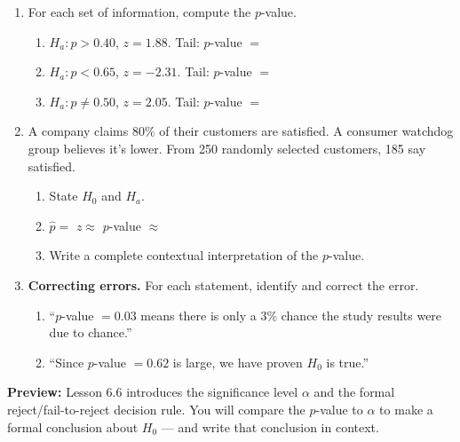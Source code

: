\documentclass[10pt]{article}
\begin{document}
\namedateperiod

\vspace{0.15in}

\begin{enumerate}

  \item For each set of information, compute the $p$-value.
        \begin{enumerate}[label=\alph*.]
          \item $H_a: p > 0.40$, $z = 1.88$. Tail: \blank{2cm} \quad $p$-value $=$ \blank{4cm}
          \item $H_a: p < 0.65$, $z = -2.31$. Tail: \blank{2cm} \quad $p$-value $=$ \blank{4cm}
          \item $H_a: p \ne 0.50$, $z = 2.05$. Tail: \blank{2cm} \quad $p$-value $=$ \blank{4cm}
        \end{enumerate}

  \item A company claims 80\% of their customers are satisfied. A consumer watchdog group
        believes it's lower. From 250 randomly selected customers, 185 say satisfied.
        \begin{enumerate}[label=\alph*.]
          \item State $H_0$ and $H_a$. \blank{8cm}
          \item $\hat p = $ \blank{2cm} \quad $z \approx$ \blank{2cm} \quad $p$-value $\approx$ \blank{3cm}
          \item Write a complete contextual interpretation of the $p$-value. 
        \end{enumerate}

  \item \textbf{Correcting errors.} For each statement, identify and correct the error.
        \begin{enumerate}[label=\alph*.]
          \item ``$p$-value $= 0.03$ means there is only a 3\% chance the study results were
                due to chance.'' 
          \item ``Since $p$-value $= 0.62$ is large, we have proven $H_0$ is true.'' 
        \end{enumerate}

\end{enumerate}

\begin{reflectionbox}
\textbf{Preview:} Lesson 6.6 introduces the significance level $\alpha$ and the formal
reject/fail-to-reject decision rule. You will compare the $p$-value to $\alpha$ to make
a formal conclusion about $H_0$ --- and write that conclusion in context.
\end{reflectionbox}
\end{document}
